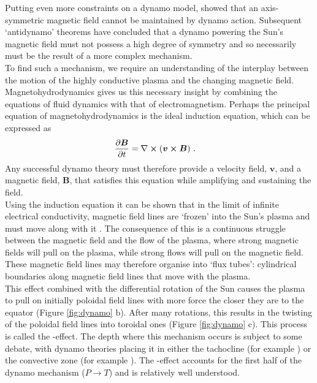 \documentclass[11pt,a4paper,onecolumn]{report}
\begin{document}
Putting even more constraints on a dynamo model, \citet{cowling1933} showed that
an axis-symmetric magnetic field cannot be maintained by dynamo action.
Subsequent `antidynamo' theorems \citep{backus1956,zeldovich_magnetic_1980} have
concluded that a dynamo powering the Sun's magnetic field must not possess a
high degree of symmetry and so necessarily must be the result of a more complex
mechanism.\\


To find such a mechanism, we require an understanding of the interplay between the
motion of the highly conductive plasma and the changing magnetic field.
Magnetohydrodynamics gives us this necessary insight by combining the
equations of fluid dynamics with that of electromagnetism. Perhaps the principal
equation of magnetohydrodynamics is the ideal induction equation, which can be expressed as
\begin{align}
  \partialderivative{\bm{B}}{t} &=
  \nabla \crossproduct \left(\bm{v}\crossproduct \bm{B}\right)\,.
  \label{eqn:ideal_induction}
\end{align}
Any successful dynamo theory must therefore provide a
velocity field, \(\bm{v}\), and a magnetic field, \(\bm{B}\), that satisfies
this equation while amplifying and sustaining the field. \\

Using the induction equation it can be shown that in the limit of infinite
electrical conductivity, magnetic field lines are `frozen' into the Sun's plasma
and must move along with it \citep{Alfven1943}. The consequence of this is a
continuous struggle between the magnetic field and the flow of the plasma, where
strong magnetic fields will pull on the plasma, while strong flows will pull
on the magnetic field. These magnetic field lines may therefore organise into
`flux tubes': cylindrical boundaries along magnetic field lines that move with
the plasma. \\


This effect combined with the differential rotation of the Sun causes the plasma
to pull on initially poloidal field lines with more force the closer they are to
the equator (Figure \ref{fig:dynamo} b). After many rotations, this results in
the twisting of the poloidal field lines into toroidal ones (Figure
\ref{fig:dynamo} c). This process is called the \textomega-effect. The depth
where this mechanism occurs is subject to some debate, with dynamo theories
placing it in either the tachocline (for example \citealt{deluca_dynamo_1988})
or the convective zone (for example \citealp{chen_emergence_2017}). The
\textomega-effect accounts for the first half of the dynamo mechanism (\(P
\rightarrow T\)) and is relatively well understood.\\
\end{document}
